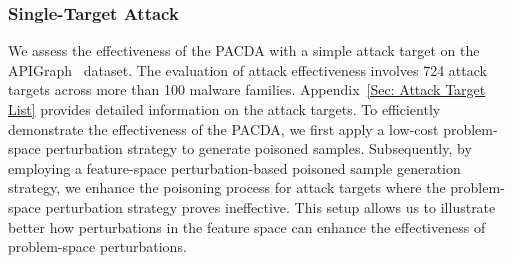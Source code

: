 \documentclass[conference,compsoc]{IEEEtran} %
\begin{document}
\subsubsection{Single-Target Attack} 
\label{Sec: Single Attack Targets}
We assess the effectiveness of the PACDA with a simple attack target on the APIGraph~\cite{2020-CCS-APIGraph} dataset.
The evaluation of attack effectiveness involves 724 attack targets across more than 100 malware families.
Appendix~\ref{Sec: Attack Target List} provides detailed information on the attack targets.
To efficiently demonstrate the effectiveness of the PACDA, we first apply a low-cost problem-space perturbation strategy to generate poisoned samples.
Subsequently, by employing a feature-space perturbation-based poisoned sample generation strategy, we enhance the poisoning process for attack targets where the problem-space perturbation strategy proves ineffective.
This setup allows us to illustrate better how perturbations in the feature space can enhance the effectiveness of problem-space perturbations.
\end{document}
